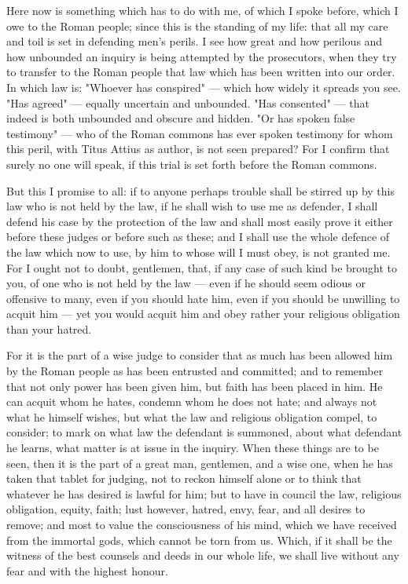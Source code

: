  Here now is something which has to do with me, of which I spoke before, which I owe to the Roman people; since this is the standing of my life: that all my care and toil is set in defending men's perils. I see how great and how perilous and how unbounded an inquiry is being attempted by the prosecutors, when they try to transfer to the Roman people that law which has been written into our order. In which law is: "Whoever has conspired" --- which how widely it spreads you see. "Has agreed" --- equally uncertain and unbounded. "Has consented" --- that indeed is both unbounded and obscure and hidden. "Or has spoken false testimony" --- who of the Roman commons has ever spoken testimony for whom this peril, with Titus Attius as author, is not seen prepared? For I confirm that surely no one will speak, if this trial is set forth before the Roman commons.

 But this I promise to all: if to anyone perhaps trouble shall be stirred up by this law who is not held by the law, if he shall wish to use me as defender, I shall defend his case by the protection of the law and shall most easily prove it either before these judges or before such as these; and I shall use the whole defence of the law which now to use, by him to whose will I must obey, is not granted me. For I ought not to doubt, gentlemen, that, if any case of such kind be brought to you, of one who is not held by the law --- even if he should seem odious or offensive to many, even if you should hate him, even if you should be unwilling to acquit him --- yet you would acquit him and obey rather your religious obligation than your hatred.

 For it is the part of a wise judge to consider that as much has been allowed him by the Roman people as has been entrusted and committed; and to remember that not only power has been given him, but faith has been placed in him. He can acquit whom he hates, condemn whom he does not hate; and always not what he himself wishes, but what the law and religious obligation compel, to consider; to mark on what law the defendant is summoned, about what defendant he learns, what matter is at issue in the inquiry. When these things are to be seen, then it is the part of a great man, gentlemen, and a wise one, when he has taken that tablet for judging, not to reckon himself alone or to think that whatever he has desired is lawful for him; but to have in council the law, religious obligation, equity, faith; lust however, hatred, envy, fear, and all desires to remove; and most to value the consciousness of his mind, which we have received from the immortal gods, which cannot be torn from us. Which, if it shall be the witness of the best counsels and deeds in our whole life, we shall live without any fear and with the highest honour.

